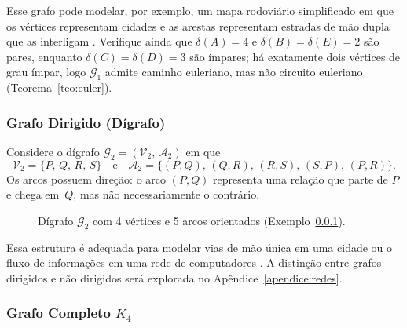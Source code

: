 \documentclass[
  12pt,
  oneside,
  a4paper,
  english,
  brazilian
  ]{abntex2}
\theoremstyle{definition}
\def\sffamily{}%
\def\bfseries{}%
\begin{document}
Esse grafo pode modelar, por exemplo, um mapa rodoviário simplificado em que os
vértices representam cidades e as arestas representam estradas de mão dupla que
as interligam \cite{jurkiewicz2007}. Verifique ainda que $\delta(A) = 4$ e
$\delta(B) = \delta(E) = 2$ são pares, enquanto $\delta(C) = \delta(D) = 3$
são ímpares; há exatamente dois vértices de grau ímpar, logo $\mathcal{G}_1$
admite caminho euleriano, mas não circuito euleriano
(Teorema~\ref{teo:euler}).

\subsubsection{Grafo Dirigido (Dígrafo)}


\label{ex:digrafo}
Considere o dígrafo $\mathcal{G}_2 = (\mathcal{V}_2,\, \mathcal{A}_2)$ em que
\[
  \mathcal{V}_2 = \{P,\, Q,\, R,\, S\}
  \quad \text{e} \quad
  \mathcal{A}_2 = \{(P,Q),\, (Q,R),\, (R,S),\, (S,P),\, (P,R)\}.
\]
Os arcos possuem direção: o arco $(P, Q)$ representa uma relação que parte de
$P$ e chega em~$Q$, mas não necessariamente o contrário.

\begin{figure}[htb]
  \centering
  \caption{Dígrafo $\mathcal{G}_2$ com 4 vértices e 5 arcos orientados
           (Exemplo~\ref{ex:digrafo}).}
  \label{fig:digrafo_ex2}
\end{figure}

Essa estrutura é adequada para modelar vias de mão única em uma cidade ou o
fluxo de informações em uma rede de computadores \cite{cormen2009}. A distinção
entre grafos dirigidos e não dirigidos será explorada no Apêndice~\ref{apendice:redes}.

\subsubsection{Grafo Completo $K_4$}
\end{document}
